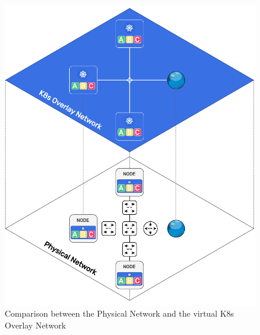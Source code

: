 \begin{figure}[htbp]
  \centering
  \includegraphics[width=.65\textwidth]{images/architecture/overlay_network.pdf}
  \caption{Comparison between the Physical Network and the virtual K8s Overlay Network}
  \label{fig:overlay_network}
\end{figure}

